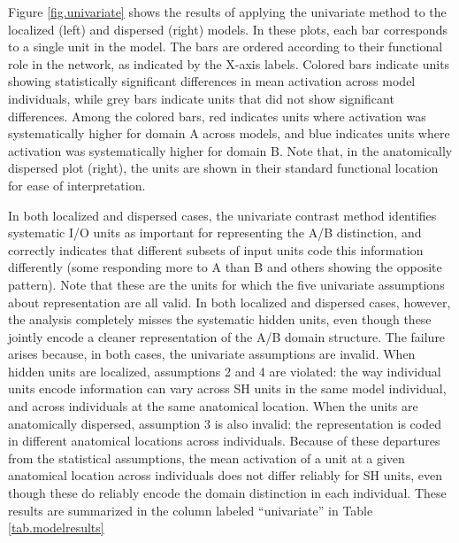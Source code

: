 Figure \ref{fig.univariate} shows the results of applying the univariate method to the localized (left) and dispersed (right) models. In these plots, each bar corresponds to a single unit in the model. The bars are ordered according to their functional role in the network, as indicated by the X-axis labels. Colored bars indicate units showing statistically significant differences in mean activation across model individuals, while grey bars indicate units that did not show significant differences. Among the colored bars, red indicates units where activation was systematically higher for domain A across models, and blue indicates units where activation was systematically higher for domain B. Note that, in the anatomically dispersed plot (right), the units are shown in their standard functional location for ease of interpretation.

In both localized and dispersed cases, the univariate contrast method identifies systematic I/O units as important for representing the A/B distinction, and correctly indicates that different subsets of input units code this information differently (some responding more to A than B and others showing the opposite pattern). Note that these are the units for which the five univariate assumptions about representation are all valid. In both localized and dispersed cases, however, the analysis completely misses the systematic hidden units, even though these jointly encode a cleaner representation of the A/B domain structure. The failure arises because, in both cases, the univariate assumptions are invalid. When hidden units are localized, assumptions 2 and 4 are violated: the way individual units encode information can vary across SH units in the same model individual, and across individuals at the same anatomical location. When the units are anatomically dispersed, assumption 3 is also invalid: the representation is coded in different anatomical locations across individuals. Because of these departures from the statistical assumptions, the mean activation of a unit at a given anatomical location across individuals does not differ reliably for SH units, even though these do reliably encode the domain distinction in each individual. These results are summarized in the column labeled ``univariate'' in Table \ref{tab.modelresults}

%

